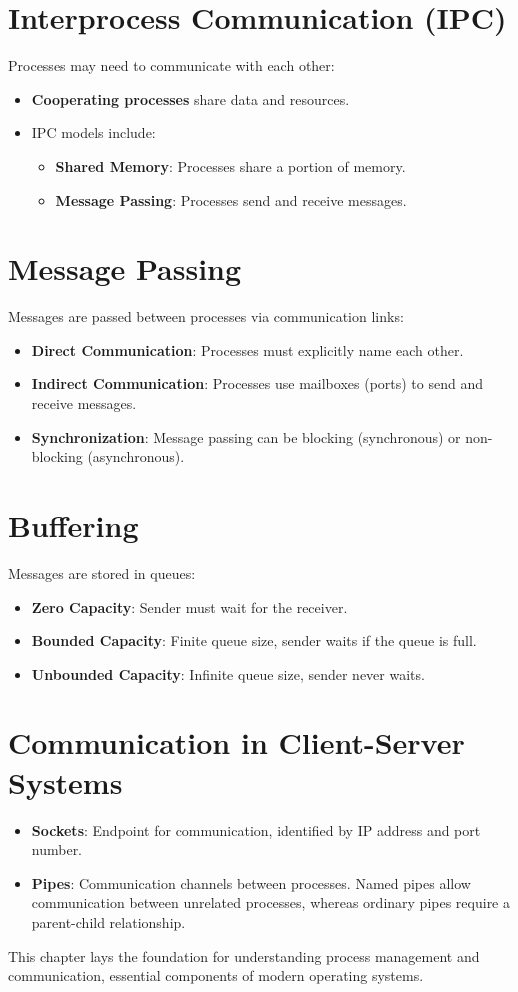 \documentclass{article}
\begin{document}
\section{Interprocess Communication (IPC)}
Processes may need to communicate with each other:
\begin{itemize}
    \item \textbf{Cooperating processes} share data and resources.
    \item IPC models include:
    \begin{itemize}
        \item \textbf{Shared Memory}: Processes share a portion of memory.
        \item \textbf{Message Passing}: Processes send and receive messages.
    \end{itemize}
\end{itemize}

\section{Message Passing}
Messages are passed between processes via communication links:
\begin{itemize}
    \item \textbf{Direct Communication}: Processes must explicitly name each other.
    \item \textbf{Indirect Communication}: Processes use mailboxes (ports) to send and receive messages.
    \item \textbf{Synchronization}: Message passing can be blocking (synchronous) or non-blocking (asynchronous).
\end{itemize}

\section{Buffering}
Messages are stored in queues:
\begin{itemize}
    \item \textbf{Zero Capacity}: Sender must wait for the receiver.
    \item \textbf{Bounded Capacity}: Finite queue size, sender waits if the queue is full.
    \item \textbf{Unbounded Capacity}: Infinite queue size, sender never waits.
\end{itemize}

\section{Communication in Client-Server Systems}
\begin{itemize}
    \item \textbf{Sockets}: Endpoint for communication, identified by IP address and port number.
    \item \textbf{Pipes}: Communication channels between processes. Named pipes allow communication between unrelated processes, whereas ordinary pipes require a parent-child relationship.
\end{itemize}

This chapter lays the foundation for understanding process management and communication, essential components of modern operating systems.
\end{document}
